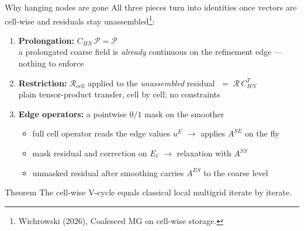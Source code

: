 \documentclass{beamer}
\begin{document}
\begin{frame}{Why hanging nodes are gone}
    \small
    All three pieces turn into identities once vectors are cell-wise and residuals stay unassembled\footnote{Wichrowski
        (2026), Coalesced MG on cell-wise storage.}:
    \vspace{0.1em}
    \begin{enumerate}
        \item \textbf{Prolongation:} \quad $C_{HN}\,\mathcal P = \mathcal P$\\
              a prolongated coarse field is \emph{already} continuous on the refinement edge --- nothing to enforce
              \pause
        \item \textbf{Restriction:} \quad $\mathcal R_{\text{cell}}$ applied to the \emph{unassembled} residual
              $\;=\; \mathcal R\, C_{HN}^T$\\
              plain tensor-product transfer, cell by cell; no constraints
              \pause
        \item \textbf{Edge operators:} \quad a pointwise $0/1$ mask on the smoother
              \begin{itemize}
                  \item full cell operator reads the edge values $u^E$ $\to$ applies $A^{SE}$ on the fly
                  \item mask residual and correction on $E_\ell$ $\to$ relaxation with $A^{SS}$
                  \item unmasked residual after smoothing carries $A^{ES}$ to the coarse level
              \end{itemize}
    \end{enumerate}
    \pause
    \begin{block}{Theorem}
        The cell-wise V-cycle equals classical local multigrid \alert{iterate by iterate}.
    \end{block}
\end{frame}
\end{document}
